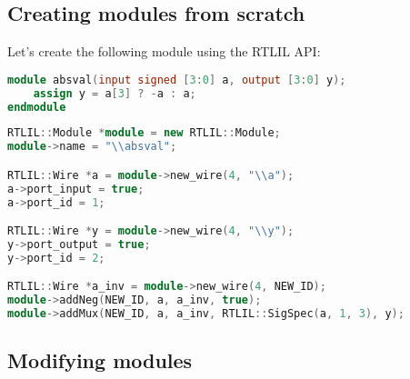 
\subsection{Creating modules from scratch}

\begin{frame}[t, fragile]{\subsecname}
Let's create the following module using the RTLIL API:

\smallskip
\begin{lstlisting}[xleftmargin=1cm, basicstyle=\ttfamily\fontsize{8pt}{10pt}\selectfont, language=Verilog]
module absval(input signed [3:0] a, output [3:0] y);
    assign y = a[3] ? -a : a;
endmodule
\end{lstlisting}

\smallskip
\begin{lstlisting}[xleftmargin=1cm, basicstyle=\ttfamily\fontsize{8pt}{10pt}\selectfont, language=C++]
RTLIL::Module *module = new RTLIL::Module;
module->name = "\\absval";

RTLIL::Wire *a = module->new_wire(4, "\\a");
a->port_input = true;
a->port_id = 1;

RTLIL::Wire *y = module->new_wire(4, "\\y");
y->port_output = true;
y->port_id = 2;

RTLIL::Wire *a_inv = module->new_wire(4, NEW_ID);
module->addNeg(NEW_ID, a, a_inv, true);
module->addMux(NEW_ID, a, a_inv, RTLIL::SigSpec(a, 1, 3), y);
\end{lstlisting}
\end{frame}


\subsection{Modifying modules}

